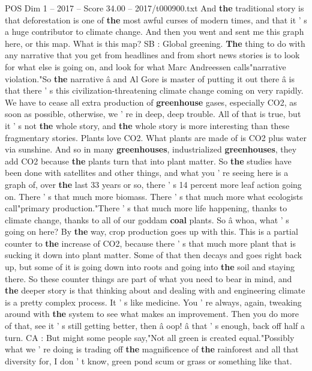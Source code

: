 \begin{textsample}{POS Dim 1 – 2017 – Score 34.00 – 2017/t000900.txt}
And \textbf{the} traditional story is that deforestation is one of \textbf{the} most awful curses of modern times, and that it ' s a huge contributor to climate change.
And then you went and sent me this graph here, or this map.
What is this map?
SB : Global greening. \textbf{The} thing to do with any narrative that you get from headlines and from short news stories is to look for what else is going on, and look for what Marc Andreessen calls"narrative violation."So \textbf{the} narrative â and Al Gore is master of putting it out there â is that there ' s this civilization-threatening climate change coming on very rapidly.
We have to cease all extra production of \textbf{greenhouse} gases, especially CO2, as soon as possible, otherwise, we ' re in deep, deep trouble.
All of that is true, but it ' s not \textbf{the} whole story, and \textbf{the} whole story is more interesting than these fragmentary stories.
Plants love CO2.
What plants are made of is CO2 plus water via sunshine.
And so in many \textbf{greenhouses}, industrialized \textbf{greenhouses}, they add CO2 because \textbf{the} plants turn that into plant matter.
So \textbf{the} studies have been done with satellites and other things, and what you ' re seeing here is a graph of, over \textbf{the} last 33 years or so, there ' s 14 percent more leaf action going on.
There ' s that much more biomass.
There ' s that much more what ecologists call"primary production."There ' s that much more life happening, thanks to climate change, thanks to all of our goddam \textbf{coal} plants.
So â whoa, what ' s going on here?
By \textbf{the} way, crop production goes up with this.
This is a partial counter to \textbf{the} increase of CO2, because there ' s that much more plant that is sucking it down into plant matter.
Some of that then decays and goes right back up, but some of it is going down into roots and going into \textbf{the} soil and staying there.
So these counter things are part of what you need to bear in mind, and \textbf{the} deeper story is that thinking about and dealing with and engineering climate is a pretty complex process.
It ' s like medicine.
You ' re always, again, tweaking around with \textbf{the} system to see what makes an improvement.
Then you do more of that, see it ' s still getting better, then â oop! â that ' s enough, back off half a turn.
CA : But might some people say,"Not all green is created equal."Possibly what we ' re doing is trading off \textbf{the} magnificence of \textbf{the} rainforest and all that diversity for, I don ' t know, green pond scum or grass or something like that.

\end{textsample}
